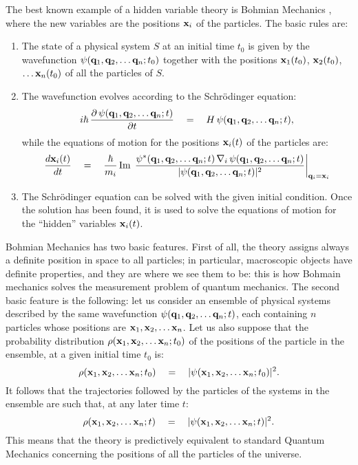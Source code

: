 \documentclass[10pt,a4paper]{article}
\begin{document}
The best known example of a hidden variable theory is Bohmian
Mechanics \cite{b1,bh,hol,dgz1,dgz2,dgz3}, where the new variables
are the positions ${\bf x}_{i}$ of the particles. The basic rules
are:
\begin{enumerate}
\item The state of a physical system $S$ at an initial time $t_{0}$
is given by the wavefunction $\psi({\bf q}_{1}, {\bf q}_{2},
\ldots {\bf q}_{n}; t_{0})$ together with the positions ${\bf
x}_{1}(t_{0})$, ${\bf x}_{2}(t_{0})$, $\ldots {\bf x}_{n}(t_{0})$
of all the particles of $S$.
\item The wavefunction evolves according to the Schr\"odinger
equation:
\[
i\hbar\, \frac{\partial\,\psi({\bf q}_{1}, {\bf q}_{2}, \ldots
{\bf q}_{n}; t)}{\partial t} \quad = \quad H\, \psi({\bf q}_{1},
{\bf q}_{2}, \ldots {\bf q}_{n}; t),
\]
while the equations of motion for the positions ${\bf x}_{i}(t)$
of the particles are:
\[
\frac{d {\bf x}_{i}(t)}{dt} \quad = \quad \frac{\hbar}{m_{i}}\,
\makebox{Im}\, \left.\frac{\psi^{*}({\bf q}_{1}, {\bf q}_{2},
\ldots {\bf q}_{n}; t)\, {\bf \nabla}_{i}\, \psi({\bf q}_{1}, {\bf
q}_{2}, \ldots {\bf q}_{n}; t)}{|\psi({\bf q}_{1}, {\bf q}_{2},
\ldots {\bf q}_{n}; t)|^{2}}\right|_{{\bf q}_{i} = {\bf x}_{i}}
\]
\item The Schr\"odinger equation can be solved with the given
initial condition. Once the solution has been found, it is used to
solve the equations of motion for the ``hidden'' variables ${\bf
x}_{i}(t)$.
\end{enumerate}

Bohmian Mechanics has two basic features. First of all, the theory
assigns always a definite position in space to all particles; in
particular, macroscopic objects have definite properties, and they
are where we see them to be: this is how Bohmain mechanics solves
the measurement problem of quantum mechanics. The second basic
feature is the following: let us consider an ensemble of physical
systems described by the same wavefunction $\psi({\bf q}_{1}, {\bf
q}_{2}, \ldots {\bf q}_{n}; t)$, each containing $n$ particles
whose positions are ${\bf x}_{1}, {\bf x}_{2}, \ldots {\bf
x}_{n}$. Let us also suppose that the probability distribution
$\rho({\bf x}_{1}, {\bf x}_{2}, \ldots {\bf x}_{n}; t_{0})$ of the
positions of the particle in the ensemble, at a given initial time
$t_{0}$ is:
\[
\rho({\bf x}_{1}, {\bf x}_{2}, \ldots {\bf x}_{n}; t_{0}) \quad =
\quad |\psi({\bf x}_{1}, {\bf x}_{2}, \ldots {\bf x}_{n};
t_{0})|^{2}.
\]
It follows that the trajectories followed by the particles of the
systems in the ensemble are such that, at any later time $t$:
\[
\rho({\bf x}_{1}, {\bf x}_{2}, \ldots {\bf x}_{n}; t) \quad =
\quad |\psi({\bf x}_{1}, {\bf x}_{2}, \ldots {\bf x}_{n}; t)|^{2}.
\]
This means that the theory is predictively equivalent to standard
Quantum Mechanics concerning the positions of all the particles of
the universe.
\end{document}
